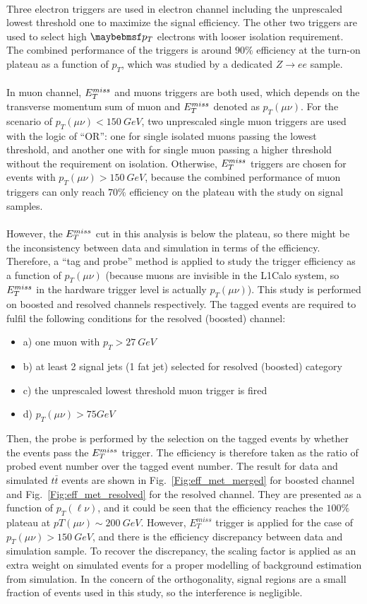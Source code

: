 \noindent
\\Three electron triggers are used in electron channel including the unprescaled lowest threshold one to maximize the signal efficiency. The other two triggers are used to select high $\p_{T}$ electrons with looser isolation requirement. The combined performance of the triggers is around $90\%$ efficiency at the turn-on plateau as a function of $p_{T}$, which was studied by a dedicated $Z\to ee$ sample\cite{Aad:2019wsl}.
\\
\\In muon channel, $E_{T}^{miss}$ and muons triggers are both used, which depends on the transverse momentum sum of muon and $E_{T}^{miss}$ denoted as $p_{T}(\mu\nu)$. For the scenario of $p_{T}(\mu\nu)<150~GeV$, two unprescaled single muon triggers are used with the logic of ``OR'': one for single isolated muons passing the lowest threshold, and another one with for single muon passing a higher threshold without the requirement on isolation. Otherwise, $E_{T}^{miss}$ triggers are chosen for events with $p_{T}(\mu\nu)>150~GeV$, because the combined performance of muon triggers can only reach $70\%$ efficiency on the plateau with the study on signal samples.
\\
\\However, the $E_{T}^{miss}$ cut in this analysis is below the plateau, so there might be the inconsistency between data and simulation in terms of the efficiency. Therefore, a ``tag and probe'' method is applied to study the trigger efficiency as a function of $p_{T}(\mu\nu)$ (because muons are invisible in the L1Calo system, so $E_{T}^{miss}$ in the hardware trigger level is actually $p_{T}(\mu\nu)$). This study is performed on boosted and resolved channels respectively. The tagged events are required to fulfil the following conditions for the resolved (boosted) channel:
\begin{itemize}
	\item[] a) one muon with $p_{T}>27~GeV$
	\item[] b) at least 2 signal jets (1 fat jet) selected for resolved (boosted) category
	\item[] c) the unprescaled lowest threshold muon trigger is fired
	\item[] d) $p_{T}(\mu\nu)>75GeV$
\end{itemize}
Then, the probe is performed by the selection on the tagged events by whether the events pass the $E_{T}^{miss}$ trigger. The efficiency is therefore taken as the ratio of probed event number over the tagged event number. The result for data and simulated $t\bar{t}$ events are shown in Fig.~\ref{Fig:eff_met_merged} for boosted channel and Fig.~\ref{Fig:eff_met_resolved} for the resolved channel. They are presented as a function of $p_{T}(\ell\nu)$, and it could be seen that the efficiency reaches the $100\%$ plateau at $pT(\mu\nu)\sim200~GeV$. However, $E^{miss}_{T}$ trigger is applied for the case of $p_{T}(\mu\nu)>150~GeV$, and there is the efficiency discrepancy between data and simulation sample. To recover the discrepancy, the scaling factor is applied as an extra weight on simulated events for a proper modelling of background estimation from simulation. In the concern of the orthogonality, signal regions are a small fraction of events used in this study, so the interference is negligible. 
